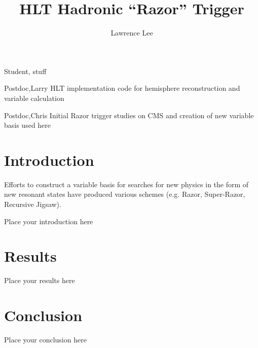 \documentclass{atlasnote}
\title{HLT Hadronic ``Razor'' Trigger}
\author[a]{Lawrence Lee}
\affil[a]{The University of Adelaide}
\begin{document}

\begin{atlascontribute}

\item[Student,] stuff
\item[Postdoc,Larry] HLT implementation code for hemisphere reconstruction and variable calculation
\item[Postdoc,Chris] Initial Razor trigger studies on CMS and creation of new variable basis used here
\end{atlascontribute}
\clearpage

%

\section{Introduction}
\label{sec:intro}

Efforts to construct a variable basis for searches for new physics in the form of new resonant states have produced various schemes (e.g. Razor, Super-Razor, Recursive Jigsaw). 



Place your introduction here

\section{Results}
\label{sec:result}

Place your results here

\section{Conclusion}
\label{sec:conclusion}

Place your conclusion here
\end{document}
